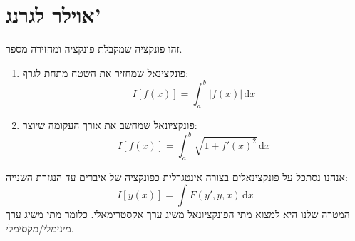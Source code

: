 \documentclass{tstextbook}
\begin{document}
\section{אוילר לגרנג'}

\begin{definition}[פונקציונאל]
זהו פונקציה שמקבלת פונקציה ומחזירה מספר. 

\end{definition}
\begin{example}
  \begin{enumerate}
    \item פונקצינאל שמחזיר את השטח מתחת לגרף: 
$$I[f(x)]=\int_{a}^b |f(x)| \, \mathrm{d}x $$


    \item פונקציונאל שמחשב את אורך העקומה שיוצר: 
$$I[f(x)]=\int_{a}^b \sqrt{ 1+f'(x)^2 } \, \mathrm{d}x $$


  \end{enumerate}
\end{example}
אנחנו נסתכל על פונקצינאלים בצורה אינטגרלית כפונקציה של איברים עד הנגזרת השנייה:
$$I[y(x)]=\int F(y',y,x) \, \mathrm{d}x $$
המטרה שלנו היא למצוא מתי הפונקציונאל משיג ערך אקסטרימאלי. כלומר מתי משיג ערך מינימלי/מקסימלי. 
\end{document}
